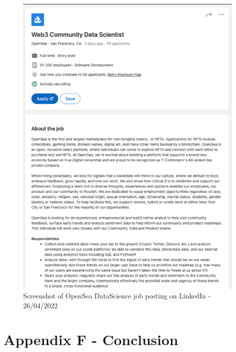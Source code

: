 \begin{figure}[h!]
\centering
\includegraphics[width=\textwidth]{images/appendix/opensea-datascientist-jobposting.png}
\caption{Screenshot of OpenSea DataScience job posting on LinkedIn - 26/04/2022}
\label{fig:appendix:self-eval}
\end{figure}

\chapter{Appendix F - Conclusion}
\label{appendix:conclusion}

